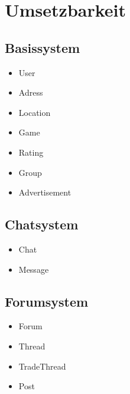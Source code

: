 \documentclass[DIV=13, 10pt,a4paper]{scrartcl}
\begin{document}
\section{Umsetzbarkeit}
\begin{multicols}{2}
	\subsection*{Basissystem}
		\begin{itemize}
			\item User
			\item Adress
			\item Location
			\item Game
			\item Rating
			\item Group
			\item Advertisement
		\end{itemize}
	\subsection*{Chatsystem}
		\begin{itemize}
			\item Chat
			\item Message
		\end{itemize}
	\subsection*{Forumsystem}
		\begin{itemize}
			\item Forum
			\item Thread
			\item TradeThread
			\item Post
		\end{itemize}
\end{multicols}
\end{document}
